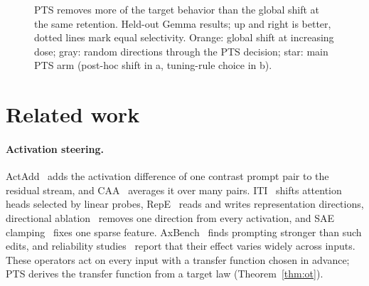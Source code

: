 \documentclass{article}
\begin{document}
\begin{figure}[t]
\caption{PTS removes more of the target behavior than the global shift at the
same retention. Held-out Gemma results; up and right is better, dotted lines
mark equal selectivity. Orange: global shift at increasing dose; gray: random
directions through the PTS decision; star: main PTS arm (post-hoc shift in a,
tuning-rule choice in b).}
\label{fig:frontier}
\end{figure}

\section{Related work}
\label{sec:related}

\paragraph{Activation steering.} ActAdd~\citep{turner2023actadd} adds the
activation difference of one contrast prompt pair to the residual stream, and
CAA~\citep{rimsky2024caa} averages it over many pairs.
ITI~\citep{li2023iti} shifts attention heads selected by linear probes,
RepE~\citep{zou2023repe} reads and writes representation directions,
directional ablation~\citep{arditi2024refusal} removes one direction from every
activation, and SAE clamping~\citep{templeton2024scaling} fixes one sparse
feature. AxBench~\citep{wu2025axbench} finds prompting stronger than
such edits, and reliability
studies~\citep{tan2024generalisation,braun2025unreliability} report that their
effect varies widely across inputs. These operators act on every input
with a transfer function chosen in advance; PTS derives the transfer function
from a target law (Theorem~\ref{thm:ot}).
\end{document}
